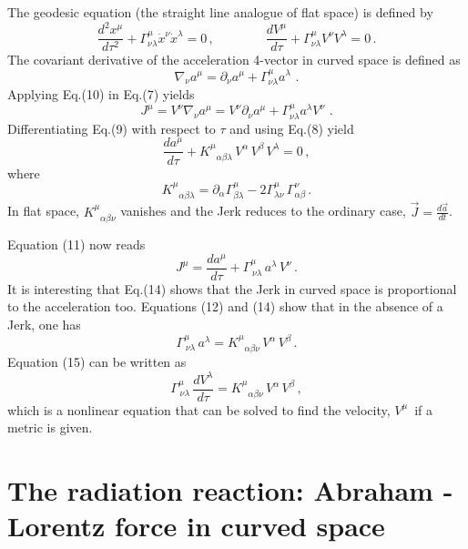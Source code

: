 \documentclass[12pt]{article}
\begin{document}
The geodesic equation (the straight line analogue of flat space) is defined by
\begin{equation}
\frac{d^2x^\mu}{d\tau^2}+\Gamma^\mu_{\nu\lambda}\dot x^\nu \dot x^\lambda=0\,,\qquad \qquad \frac{dV^\mu}{d\tau}+\Gamma^\mu_{\nu\lambda}V^\nu V^\lambda=0 \,.
\end{equation}
The covariant derivative of the acceleration 4-vector in curved space is defined as
\begin{equation}
\nabla_\nu  a^\mu=\partial_\nu a^\mu+\Gamma^\mu_{\nu\lambda}a^\lambda\, \,.
\end{equation}
Applying Eq.(10) in Eq.(7) yields
\begin{equation}
J^{\mu}=V^\nu\nabla_\nu  a^\mu=V^\nu\partial_\nu a^\mu+\Gamma^\mu_{\nu\lambda}a^\lambda V^\nu\, \,.
\end{equation}
Differentiating Eq.(9) with respect to $\tau$ and using Eq.(8) yield
\begin{equation}
\frac{da^\mu}{d\tau}+K^\mu_{\,\,\,\,\alpha\beta\lambda}\, V^\alpha\,V^\beta\, V^\lambda=0\,,
\end{equation}
where
\begin{equation}
K^\mu_{\,\,\,\,\alpha\beta\lambda}=\partial_\alpha\Gamma^\mu_{\beta\lambda}-2\Gamma^\mu_{\lambda\nu}\,\Gamma^\nu_{\alpha\beta}\,.
\end{equation}
In flat space, $K^\mu_{\,\,\,\,\alpha\beta\nu}$ vanishes and the Jerk reduces to the ordinary case, $\vec{J}=\frac{d\vec{a}}{dt}$.

Equation (11) now reads
\begin{equation}
J^\mu=\frac{da^\mu}{d\tau}+\Gamma ^\mu_{\,\nu\lambda}\, a^\lambda\,V^\nu\,.
\end{equation}
It is interesting that Eq.(14) shows that the Jerk in curved space is proportional to the acceleration too.
Equations (12) and (14) show that in the absence of a Jerk, one has
\begin{equation}
\Gamma ^\mu_{\,\nu\lambda}\, a^\lambda=K^\mu_{\,\,\,\,\alpha\beta\nu}\, V^\alpha\,V^\beta\,.
\end{equation}
Equation (15) can be written as
\begin{equation}
\Gamma ^\mu_{\,\nu\lambda}\, \frac{dV^\lambda}{d\tau}=K^\mu_{\,\,\,\,\alpha\beta\nu}\, V^\alpha\,V^\beta\,,
\end{equation}
which is a nonlinear equation that can be solved to find the velocity, $V^\mu$\, if a metric is given.

\section{{The radiation reaction: Abraham - Lorentz force in curved space}}
\end{document}

